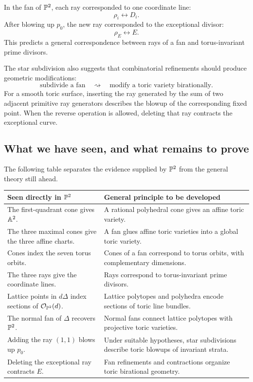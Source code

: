 In the fan of \(\mathbb{P}^2\), each ray corresponded to one coordinate line:
\[
\rho_i\longleftrightarrow D_i.
\]
After blowing up \(p_0\), the new ray corresponded to the exceptional
divisor:
\[
\rho_E\longleftrightarrow E.
\]
This predicts a general correspondence between rays of a fan and
torus-invariant prime divisors.

The star subdivision also suggests that combinatorial refinements
should produce geometric modifications:
\[
\text{subdivide a fan}
\quad\rightsquigarrow\quad
\text{modify a toric variety birationally}.
\]
For a smooth toric surface, inserting the ray generated by the sum of
two adjacent primitive ray generators describes the blowup of the
corresponding fixed point. When the reverse operation is allowed,
deleting that ray contracts the exceptional curve.

\subsection*{What we have seen, and what remains to prove}

The following table separates the evidence supplied by \(\mathbb{P}^2\) from
the general theory still ahead.

\begin{center}
\small
\begin{tabularx}{\linewidth}{@{}
  >{\raggedright\arraybackslash}X
  >{\raggedright\arraybackslash}X@{}}
\toprule
\textbf{Seen directly in \(\mathbb{P}^2\)}
&
\textbf{General principle to be developed}
\\
\midrule
The first-quadrant cone gives \(\mathbb{A}^2\).
&
A rational polyhedral cone gives an affine toric variety.
\\[1mm]
The three maximal cones give the three affine charts.
&
A fan glues affine toric varieties into a global toric variety.
\\[1mm]
Cones index the seven torus orbits.
&
Cones of a fan correspond to torus orbits, with complementary
dimensions.
\\[1mm]
The three rays give the coordinate lines.
&
Rays correspond to torus-invariant prime divisors.
\\[1mm]
Lattice points in \(d\Delta\) index sections of
\(\mathcal{O}_{\mathbb{P}^2}(d)\).
&
Lattice polytopes and polyhedra encode sections of toric line bundles.
\\[1mm]
The normal fan of \(\Delta\) recovers \(\mathbb{P}^2\).
&
Normal fans connect lattice polytopes with projective toric varieties.
\\[1mm]
Adding the ray \((1,1)\) blows up \(p_0\).
&
Under suitable hypotheses, star subdivisions describe toric blowups
of invariant strata.
\\[1mm]
Deleting the exceptional ray contracts \(E\).
&
Fan refinements and contractions organize toric birational geometry.
\\
\bottomrule
\end{tabularx}
\end{center}

